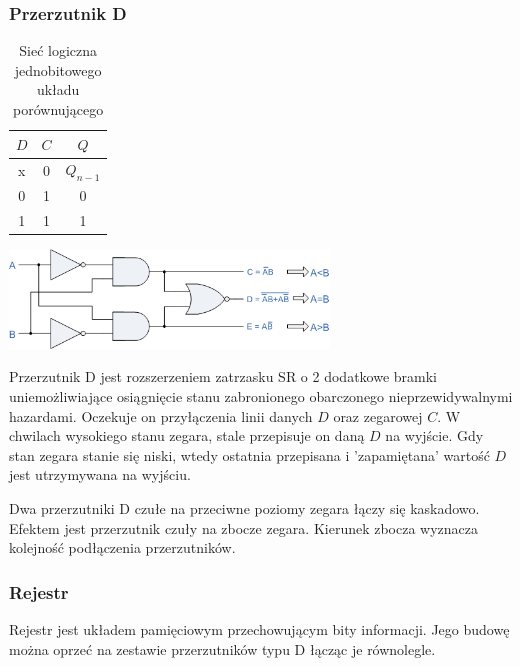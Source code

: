 \documentclass[a4paper,12pt]{article}
\begin{document}
\subsubsection{Przerzutnik D}

\begin{table}[h!]
\centering

\begin{minipage}{6.5cm}
\centering

\begin{tabular}{ | c | c || c | }
  \hline
  $D$ & $C$ & $Q$ \\ \hline
  x & 0 & $Q_{n-1}$ \\
  0 & 1 & 0 \\
  1 & 1 & 1 \\
  \hline
\end{tabular}
\end{minipage}
\begin{minipage}{10cm}
   \includegraphics[width=8.5cm]{grafika/obwody/cmp.png}
   \caption*{Sieć logiczna jednobitowego układu porównującego}
\end{minipage}
\end{table}

Przerzutnik D jest rozszerzeniem zatrzasku SR o 2 dodatkowe bramki uniemożliwiające osiągnięcie stanu zabronionego obarczonego nieprzewidywalnymi hazardami. Oczekuje on przyłączenia linii danych $D$ oraz zegarowej $C$. W chwilach wysokiego stanu zegara, stale przepisuje on daną $D$ na wyjście. Gdy stan zegara stanie się niski, wtedy ostatnia przepisana i 'zapamiętana' wartość $D$ jest utrzymywana na wyjściu.


Dwa przerzutniki D czułe na przeciwne poziomy zegara łączy się kaskadowo. Efektem jest przerzutnik czuły na zbocze zegara. Kierunek zbocza wyznacza kolejność podłączenia przerzutników.

\subsubsection{Rejestr}

Rejestr jest układem pamięciowym przechowującym bity informacji. Jego budowę można oprzeć na zestawie przerzutników typu D łącząc je równolegle.
\end{document}
